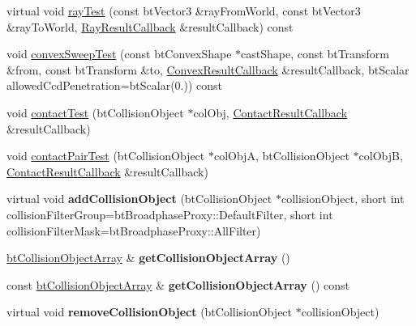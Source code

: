 \begin{DoxyCompactItemize}
\item 
virtual void \hyperlink{classbt_collision_world_aaac6675c8134f6695fecb431c72b0a6a}{ray\+Test} (const bt\+Vector3 \&ray\+From\+World, const bt\+Vector3 \&ray\+To\+World, \hyperlink{structbt_collision_world_1_1_ray_result_callback}{Ray\+Result\+Callback} \&result\+Callback) const 
\item 
void \hyperlink{classbt_collision_world_aeeee096b94a5eb31e8c88a29b6c69d37}{convex\+Sweep\+Test} (const bt\+Convex\+Shape $\ast$cast\+Shape, const bt\+Transform \&from, const bt\+Transform \&to, \hyperlink{structbt_collision_world_1_1_convex_result_callback}{Convex\+Result\+Callback} \&result\+Callback, bt\+Scalar allowed\+Ccd\+Penetration=bt\+Scalar(0.)) const 
\item 
void \hyperlink{classbt_collision_world_ae1d167b53de82d4f97a47118f8480999}{contact\+Test} (bt\+Collision\+Object $\ast$col\+Obj, \hyperlink{structbt_collision_world_1_1_contact_result_callback}{Contact\+Result\+Callback} \&result\+Callback)
\item 
void \hyperlink{classbt_collision_world_aabbec542dcd348041db6d07b36a640c8}{contact\+Pair\+Test} (bt\+Collision\+Object $\ast$col\+Obj\+A, bt\+Collision\+Object $\ast$col\+Obj\+B, \hyperlink{structbt_collision_world_1_1_contact_result_callback}{Contact\+Result\+Callback} \&result\+Callback)
\item 
\hypertarget{classbt_collision_world_a3ca1134733136dc68691a8cd73196cc6}{virtual void {\bfseries add\+Collision\+Object} (bt\+Collision\+Object $\ast$collision\+Object, short int collision\+Filter\+Group=bt\+Broadphase\+Proxy\+::\+Default\+Filter, short int collision\+Filter\+Mask=bt\+Broadphase\+Proxy\+::\+All\+Filter)}\label{classbt_collision_world_a3ca1134733136dc68691a8cd73196cc6}

\item 
\hypertarget{classbt_collision_world_a43e878669b2e755992acc41fad1cda30}{\hyperlink{classbt_aligned_object_array}{bt\+Collision\+Object\+Array} \& {\bfseries get\+Collision\+Object\+Array} ()}\label{classbt_collision_world_a43e878669b2e755992acc41fad1cda30}

\item 
\hypertarget{classbt_collision_world_a1bdae12d25ff59a26bd38c7fbb863795}{const \hyperlink{classbt_aligned_object_array}{bt\+Collision\+Object\+Array} \& {\bfseries get\+Collision\+Object\+Array} () const }\label{classbt_collision_world_a1bdae12d25ff59a26bd38c7fbb863795}

\item 
\hypertarget{classbt_collision_world_a4e995146fe0b4ba6ea0024c1ea0380c3}{virtual void {\bfseries remove\+Collision\+Object} (bt\+Collision\+Object $\ast$collision\+Object)}\label{classbt_collision_world_a4e995146fe0b4ba6ea0024c1ea0380c3}


\end{DoxyCompactItemize}

